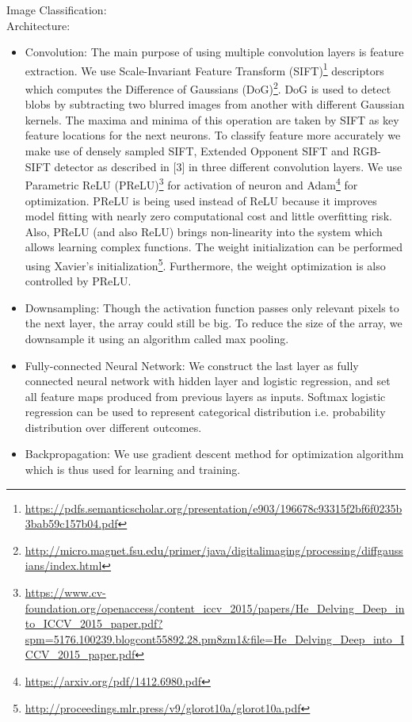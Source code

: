 \documentclass[10pt,a4]{article}
\begin{document}
\begin{itemize}
	Image Classification:
	\\Architecture:
	\begin{itemize}
		\item Convolution: The main purpose of using multiple convolution layers is feature extraction. We use Scale-Invariant Feature Transform (SIFT)\footnote{\url{https://pdfs.semanticscholar.org/presentation/e903/196678c93315f2bf6f0235b3bab59c157b04.pdf}} descriptors which computes the Difference of Gaussians (DoG)\footnote{\url{http://micro.magnet.fsu.edu/primer/java/digitalimaging/processing/diffgaussians/index.html}}. DoG is used to detect blobs by subtracting two blurred images from another with different Gaussian kernels. The maxima and minima of this operation are taken by SIFT as key feature locations for the next neurons. To classify feature more accurately we make use of densely sampled SIFT, Extended Opponent SIFT and RGB-SIFT detector as described in [3] in three different convolution layers. We use Parametric ReLU (PReLU)\footnote{\url{https://www.cv-foundation.org/openaccess/content_iccv_2015/papers/He_Delving_Deep_into_ICCV_2015_paper.pdf?spm=5176.100239.blogcont55892.28.pm8zm1&file=He_Delving_Deep_into_ICCV_2015_paper.pdf}} for activation of neuron and Adam\footnote{\url{https://arxiv.org/pdf/1412.6980.pdf}} for optimization. PReLU is being used instead of ReLU because it improves model fitting with nearly zero computational cost and little overfitting risk. Also, PReLU (and also ReLU) brings non-linearity into the system which allows learning complex functions. The weight initialization can be performed using Xavier's initialization\footnote{\url{http://proceedings.mlr.press/v9/glorot10a/glorot10a.pdf}}. Furthermore, the weight optimization is also controlled by PReLU.
		\item Downsampling:  Though the activation function passes only relevant pixels to the next layer, the array could still be big. To reduce the size of the array, we downsample it using an algorithm called max pooling.
		\item Fully-connected Neural Network: We construct the last layer as fully connected neural network with hidden layer and logistic regression, and set all feature maps produced from previous layers as inputs. Softmax logistic regression can be used to represent categorical distribution i.e. probability distribution over different outcomes.
		\item Backpropagation: We use gradient descent method for optimization algorithm which is thus used for learning and training.
	\end{itemize}
	

\end{itemize}
\end{document}
